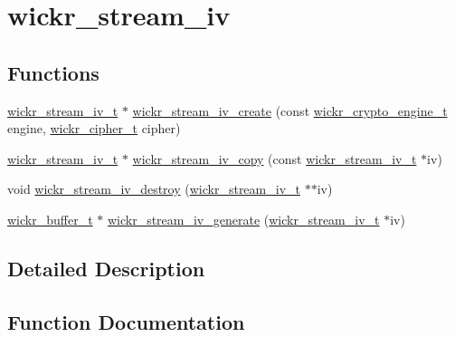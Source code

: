 \hypertarget{group__wickr__stream__iv}{}\section{wickr\+\_\+stream\+\_\+iv}
\label{group__wickr__stream__iv}
\subsection*{Functions}
\begin{DoxyCompactItemize}
\item 
\hyperlink{structwickr__stream__iv}{wickr\+\_\+stream\+\_\+iv\+\_\+t} $\ast$ \hyperlink{group__wickr__stream__iv_gaaad5726a228b7866b0cb392c131f95be}{wickr\+\_\+stream\+\_\+iv\+\_\+create} (const \hyperlink{structwickr__crypto__engine}{wickr\+\_\+crypto\+\_\+engine\+\_\+t} engine, \hyperlink{structwickr__cipher}{wickr\+\_\+cipher\+\_\+t} cipher)
\item 
\hyperlink{structwickr__stream__iv}{wickr\+\_\+stream\+\_\+iv\+\_\+t} $\ast$ \hyperlink{group__wickr__stream__iv_gaec8a5b5d70a86997c8158d047c7eed34}{wickr\+\_\+stream\+\_\+iv\+\_\+copy} (const \hyperlink{structwickr__stream__iv}{wickr\+\_\+stream\+\_\+iv\+\_\+t} $\ast$iv)
\item 
void \hyperlink{group__wickr__stream__iv_gad6ac87d891822a866a0d7cad48f79e27}{wickr\+\_\+stream\+\_\+iv\+\_\+destroy} (\hyperlink{structwickr__stream__iv}{wickr\+\_\+stream\+\_\+iv\+\_\+t} $\ast$$\ast$iv)
\item 
\hyperlink{structwickr__buffer}{wickr\+\_\+buffer\+\_\+t} $\ast$ \hyperlink{group__wickr__stream__iv_gaddcfdc9904ec0ffd32ce8f988aefc484}{wickr\+\_\+stream\+\_\+iv\+\_\+generate} (\hyperlink{structwickr__stream__iv}{wickr\+\_\+stream\+\_\+iv\+\_\+t} $\ast$iv)
\end{DoxyCompactItemize}


\subsection{Detailed Description}


\subsection{Function Documentation}
\mbox{\label{group__wickr__stream__iv_gaec8a5b5d70a86997c8158d047c7eed34}} 
